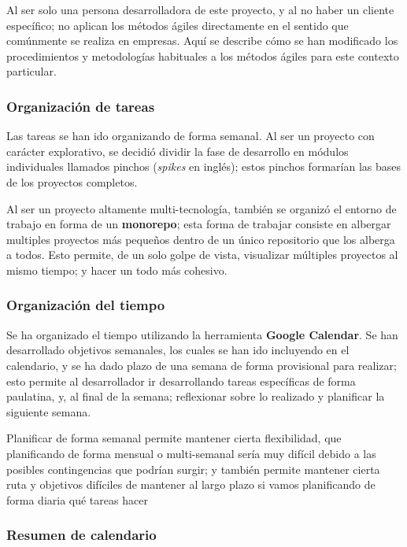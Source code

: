 \documentclass[12pt,a4paper,twoside,openright]{book}
\begin{document}
Al ser solo una persona desarrolladora de este proyecto, y al no haber un cliente específico; no aplican los métodos ágiles directamente en el sentido que comúnmente se realiza en empresas. Aquí se describe cómo se han modificado los procedimientos y metodologías habituales a los métodos ágiles para este contexto particular.

\subsubsection{Organización de tareas}

Las tareas se han ido organizando de forma semanal. Al ser un proyecto con carácter explorativo, se decidió dividir la fase de desarrollo en módulos individuales llamados pinchos (\textit{spikes} en inglés); estos pinchos formarían las bases de los proyectos completos.

Al ser un proyecto altamente multi-tecnología, también se organizó el entorno de trabajo en forma de un \textbf{monorepo}; esta forma de trabajar consiste en albergar multiples proyectos más pequeños dentro de un único repositorio que los alberga a todos. Esto permite, de un solo golpe de vista, visualizar múltiples proyectos al mismo tiempo; y hacer un todo más cohesivo.

\subsubsection{Organización del tiempo}

Se ha organizado el tiempo utilizando la herramienta \textbf{Google Calendar}. Se han desarrollado objetivos semanales, los cuales se han ido incluyendo en el calendario, y se ha dado plazo de una semana de forma provisional para realizar; esto permite al desarrollador ir desarrollando tareas específicas de forma paulatina, y, al final de la semana; reflexionar sobre lo realizado y planificar la siguiente semana.

Planificar de forma semanal permite mantener cierta flexibilidad, que planificando de forma mensual o multi-semanal sería muy difícil debido a las posibles contingencias que podrían surgir; y también permite mantener cierta ruta y objetivos difíciles de mantener al largo plazo si vamos planificando de forma diaria qué tareas hacer 

\subsubsection{Resumen de calendario}
\end{document}
